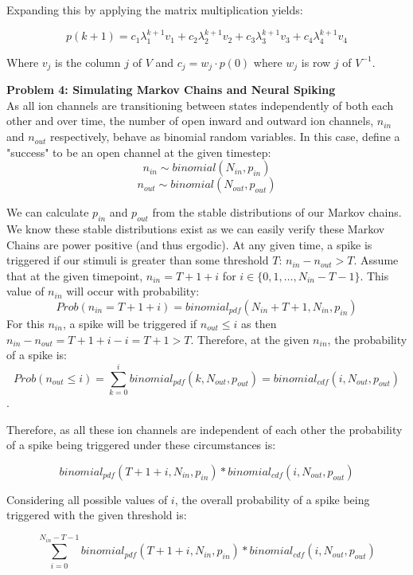 \documentclass[12pt,a4paper]{article}
\begin{document}
Expanding this by applying the matrix multiplication yields:

$$p(k+1) = c_1\lambda_1^{k+1}v_1 + c_2\lambda_2^{k+1}v_2 +c_3\lambda_3^{k+1}v_3 +c_4\lambda_4^{k+1}v_4$$

Where $v_j$ is the column $j$ of $V$ and $c_j = w_j \cdot p(0)$ where $w_j$ is row $j$ of $V^{-1}$. \\



\vskip 10in


\textbf{Problem 4: Simulating Markov Chains and Neural Spiking}\\

As all ion channels are transitioning between states independently of both each other and over time, the number of open inward and outward ion channels, $n_{in}$ and $n_{out}$ respectively, behave as binomial random variables. In this case, define a "success" to be an open channel at the given timestep:\\

$$n_{in} \sim binomial(N_{in}, p_{in})$$
$$n_{out} \sim binomial(N_{out}, p_{out})$$

We can calculate $p_{in}$ and $p_{out}$ from the stable distributions of our Markov chains. We know these stable distributions exist as we can easily verify these Markov Chains are power positive (and thus ergodic). At any given time, a spike is triggered if our stimuli is greater than some threshold $T$: $n_{in} - n_{out} > T$. Assume that at the given timepoint, $n_{in} = T + 1 + i$ for $i \in \{0, 1, \hdots ,N_{in} - T - 1\}$. This value of $n_{in}$ will occur with probability:
 $$Prob(n_{in} = T+1+i) = binomial_{pdf}(N_{in} + T + 1, N_{in}, p_{in})$$
For this $n_{in}$, a spike will be triggered if $n_{out} \leq i$ as then $n_{in} - n_{out} = T+1+i - i = T+1 > T$. Therefore, at the given $n_{in}$, the probability of a spike is:
 $$Prob(n_{out} \leq i) = \sum_{k = 0}^{i} binomial_{pdf}(k, N_{out}, p_{out}) =binomial_{cdf}(i, N_{out}, p_{out})$$. 
 
Therefore, as all these ion channels are independent of each other the probability of a spike being triggered under these circumstances is:

 $$binomial_{pdf}(T+1+i, N_{in}, p_{in}) * binomial_{cdf}(i, N_{out}, p_{out})$$
 
Considering all possible values of $i$, the overall probability of a spike being triggered with the given threshold is:

$$\sum_{i = 0}^{N_{in}-T-1} binomial_{pdf}(T+1+i, N_{in}, p_{in}) * binomial_{cdf}(i, N_{out}, p_{out})$$
\end{document}
